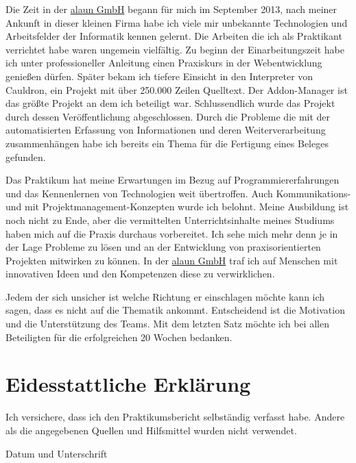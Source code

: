 \documentclass[12pt]{article}
\begin{document}
Die Zeit in der \href{https://alaun.de/home/}{alaun GmbH} begann für mich im September 2013, nach meiner
Ankunft in dieser kleinen Firma habe ich viele mir unbekannte Technologien und 
Arbeitsfelder der Informatik kennen gelernt. Die Arbeiten die ich als Praktikant verrichtet habe waren ungemein
vielfältig. Zu beginn der Einarbeitungszeit habe ich unter professioneller Anleitung einen Praxiskurs in der Webentwicklung
genießen dürfen. Später bekam ich tiefere Einsicht in den Interpreter von Cauldron, ein Projekt mit über 250.000 Zeilen
Quelltext. Der Addon-Manager ist das größte Projekt an dem ich beteiligt war. Schlussendlich wurde das Projekt durch dessen
Veröffentlichung abgeschlossen. Durch die Probleme die mit der automatisierten Erfassung von Informationen und deren Weiterverarbeitung zusammenhängen habe ich bereits ein Thema für die Fertigung eines Beleges gefunden.

Das Praktikum hat meine Erwartungen im Bezug auf Programmiererfahrungen und das Kennenlernen von Technologien weit übertroffen.
Auch Kommunikations- und mit Projektmanagement-Konzepten wurde ich belohnt. Meine Ausbildung ist noch nicht zu Ende, aber
die vermittelten Unterrichtsinhalte meines Studiums haben mich auf die Praxis durchaus vorbereitet.
Ich sehe mich mehr denn je in der Lage Probleme zu lösen und an der Entwicklung von praxisorientierten Projekten mitwirken zu können.
In der \href{https://alaun.de/home/}{alaun GmbH} traf ich auf Menschen mit innovativen Ideen und den Kompetenzen diese
zu verwirklichen.

Jedem der sich unsicher ist welche Richtung er einschlagen möchte kann ich sagen, dass es nicht auf die Thematik ankommt.
Entscheidend ist die Motivation und die Unterstützung des Teams.
Mit dem letzten Satz möchte ich bei allen Beteiligten für die erfolgreichen 20 Wochen bedanken.

\newpage

\section{Eidesstattliche Erklärung}

Ich versichere, dass ich den Praktikumsbericht selbständig verfasst habe. Andere als die angegebenen Quellen und Hilfsmittel wurden nicht verwendet.

\vspace*{3cm}

\noindent Datum und Unterschrift
\end{document}
